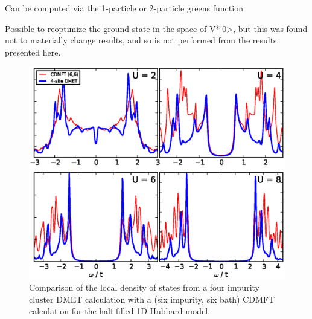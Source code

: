 \documentclass[aps,showpacs,twocolumn,nobibnotes]{revtex4}
\begin{document}
Can be computed via the 1-particle or 2-particle greens function

Possible to reoptimize the ground state in the space of V*|0>, but this was found not to materially change results, and so is not performed from the results presented here.

\begin{figure}
\begin{center}
\includegraphics[scale=0.475]{Plots/1D_Spectra/1D_Hub_Spectra.eps}
\end{center}
\caption{Comparison of the local density of states from a four impurity cluster DMET calculation with a
(six impurity, six bath) CDMFT calculation for the half-filled 1D Hubbard model.}
\label{1D_DOS}
\end{figure}
\end{document}
